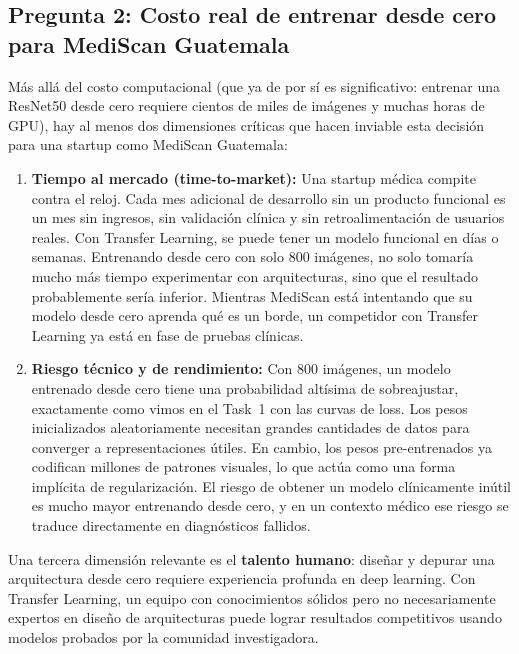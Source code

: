 \documentclass[12pt, letterpaper]{article}
\begin{document}
\subsection{Pregunta 2: Costo real de entrenar desde cero para MediScan Guatemala}

Más allá del costo computacional (que ya de por sí es significativo: entrenar una ResNet50
desde cero requiere cientos de miles de imágenes y muchas horas de GPU), hay al menos dos
dimensiones críticas que hacen inviable esta decisión para una startup como MediScan Guatemala:

\begin{enumerate}[leftmargin=1.5cm]
    \item \textbf{Tiempo al mercado (time-to-market):} Una startup médica compite contra el
    reloj. Cada mes adicional de desarrollo sin un producto funcional es un mes sin ingresos,
    sin validación clínica y sin retroalimentación de usuarios reales. Con Transfer Learning,
    se puede tener un modelo funcional en días o semanas. Entrenando desde cero con solo 800
    imágenes, no solo tomaría mucho más tiempo experimentar con arquitecturas, sino que el
    resultado probablemente sería inferior. Mientras MediScan está intentando que su modelo
    desde cero aprenda qué es un borde, un competidor con Transfer Learning ya está en fase
    de pruebas clínicas.

    \item \textbf{Riesgo técnico y de rendimiento:} Con 800 imágenes, un modelo entrenado desde
    cero tiene una probabilidad altísima de sobreajustar, exactamente como vimos en el Task~1
    con las curvas de loss. Los pesos inicializados aleatoriamente necesitan grandes cantidades
    de datos para converger a representaciones útiles. En cambio, los pesos pre-entrenados ya
    codifican millones de patrones visuales, lo que actúa como una forma implícita de
    regularización. El riesgo de obtener un modelo clínicamente inútil es mucho mayor
    entrenando desde cero, y en un contexto médico ese riesgo se traduce directamente en
    diagnósticos fallidos.
\end{enumerate}

Una tercera dimensión relevante es el \textbf{talento humano}: diseñar y depurar una
arquitectura desde cero requiere experiencia profunda en deep learning. Con Transfer Learning,
un equipo con conocimientos sólidos pero no necesariamente expertos en diseño de arquitecturas
puede lograr resultados competitivos usando modelos probados por la comunidad investigadora.
\end{document}
